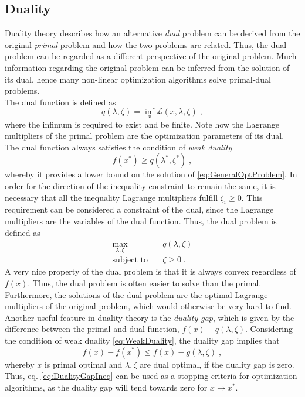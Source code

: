 \subsection{Duality}
Duality theory describes how an alternative \textit{dual} problem can be derived from the original \textit{primal} problem and how the two problems are related. Thus, the dual problem can be regarded as a different perspective of the original problem. Much information regarding the original problem can be inferred from the solution of its dual, hence many non-linear optimization algorithms solve primal-dual problems.\\
The dual function is defined as
\begin{equation}
	q (\lambda , \zeta) = \inf_{x} \mathcal{L} (x,\lambda,\zeta) \; ,
\end{equation}
where the infimum is required to exist and be finite. Note how the Lagrange multipliers of the primal problem are the optimization parameters of its dual. The dual function always satisfies the condition of \textit{weak duality}
\begin{equation}
	f(x^*) \geq q (\lambda^* , \zeta^*) \; ,
	\label{eq:WeakDuality}
\end{equation} 
whereby it provides a lower bound on the solution of \eqref{eq:GeneralOptProblem}. In order for the direction of the inequality constraint to remain the same, it is necessary that all the inequality Lagrange multipliers fulfill $\zeta_i \geq 0$. This requirement can be considered a constraint of the dual, since the Lagrange multipliers are the variables of the dual function. Thus, the dual problem is defined as
\begin{subequations}	
 \begin{align}
	\max_{\lambda , \zeta} 	\quad 	& q(\lambda , \zeta) 				\\
	\text{subject to} 		\quad 	& \zeta \geq 0  			\; .
\end{align}
\label{eq:GeneralDualProblem}
\end{subequations}
A very nice property of the dual problem is that it is always convex regardless of $f(x)$. Thus, the dual problem is often easier to solve than the primal. Furthermore, the solutions of the dual problem are the optimal Lagrange multipliers of the original problem, which would otherwise be very hard to find.
Another useful feature in duality theory is the \textit{duality gap}, which is given by the difference between the primal and dual function, $f(x) - q(\lambda , \zeta )$. Considering the condition of weak duality \eqref{eq:WeakDuality}, the duality gap implies that
\begin{equation}
	f(x) - f(x^*) \leq f(x) - g(\lambda , \zeta) \; ,
	\label{eq:DualityGapIneq}
\end{equation}
whereby $x$ is primal optimal and $\lambda , \zeta$ are dual optimal, if the duality gap is zero. Thus, eq. \eqref{eq:DualityGapIneq} can be used as a stopping criteria for optimization algorithms, as the duality gap will tend towards zero for $x \to x^*$.


